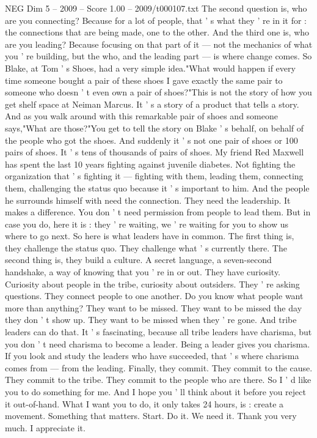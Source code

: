 \begin{textsample}{NEG Dim 5 – 2009 – Score 1.00 – 2009/t000107.txt}
The second question is, who are you connecting?
Because for a lot of people, that ' s what they ' re in it for : the connections that are being made, one to the other.
And the third one is, who are you leading?
Because focusing on that part of it — not the mechanics of what you ' re building, but the who, and the leading part — is where change comes.
So Blake, at Tom ' s Shoes, had a very simple idea."What would happen if every time someone bought a pair of these shoes I gave exactly the same pair to someone who doesn ' t even own a pair of shoes?"This is not the story of how you get shelf space at Neiman Marcus.
It ' s a story of a product that tells a story.
And as you walk around with this remarkable pair of shoes and someone says,"What are those?"You get to tell the story on Blake ' s behalf, on behalf of the people who got the shoes.
And suddenly it ' s not one pair of shoes or 100 pairs of shoes.
It ' s tens of thousands of pairs of shoes.
My friend Red Maxwell has spent the last 10 years fighting against juvenile diabetes.
Not fighting the organization that ' s fighting it — fighting with them, leading them, connecting them, challenging the status quo because it ' s important to him.
And the people he surrounds himself with need the connection.
They need the leadership.
It makes a difference.
You don ' t need permission from people to lead them.
But in case you do, here it is : they ' re waiting, we ' re waiting for you to show us where to go next.
So here is what leaders have in common.
The first thing is, they challenge the status quo.
They challenge what ' s currently there.
The second thing is, they build a culture.
A secret language, a seven-second handshake, a way of knowing that you ' re in or out.
They have curiosity.
Curiosity about people in the tribe, curiosity about outsiders.
They ' re asking questions.
They connect people to one another.
Do you know what people want more than anything?
They want to be missed.
They want to be missed the day they don ' t show up.
They want to be missed when they ' re gone.
And tribe leaders can do that.
It ' s fascinating, because all tribe leaders have charisma, but you don ' t need charisma to become a leader.
Being a leader gives you charisma.
If you look and study the leaders who have succeeded, that ' s where charisma comes from — from the leading.
Finally, they commit.
They commit to the cause.
They commit to the tribe.
They commit to the people who are there.
So I ' d like you to do something for me.
And I hope you ' ll think about it before you reject it out-of-hand.
What I want you to do, it only takes 24 hours, is : create a movement.
Something that matters.
Start.
Do it.
We need it.
Thank you very much.
I appreciate it.

\end{textsample}
